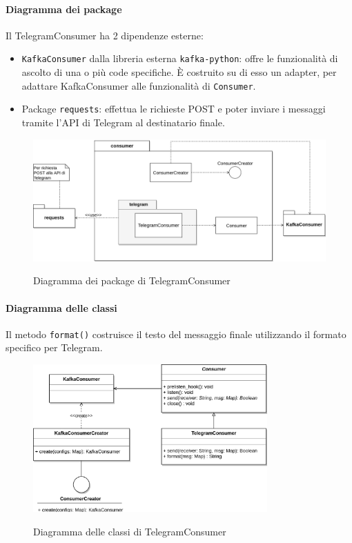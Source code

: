 \paragraph{Diagramma dei package}

Il TelegramConsumer ha 2 dipendenze esterne:
\begin{itemize}
    \item \texttt{KafkaConsumer} dalla libreria esterna \texttt{kafka-python}: offre le funzionalità di ascolto
        di una o più code specifiche. È costruito su di esso un adapter, per adattare KafkaConsumer alle funzionalità
        di \texttt{Consumer}.
    \item Package \texttt{requests}: effettua le richieste POST e poter inviare i messaggi tramite l'API di Telegram
        al destinatario finale.
\end{itemize}

\begin{figure}[H]
    \centering
    \includegraphics[width=\textwidth]{img/Package-TelegramConsumer.png}\\
    \caption{Diagramma dei package di TelegramConsumer}
\end{figure}

\paragraph{Diagramma delle classi}

Il metodo \texttt{format()} costruisce il testo del messaggio finale utilizzando il formato  specifico per Telegram.

\begin{figure}[H]
    \centering
    \includegraphics[width=0.8\textwidth]{img/Consumers-TelegramConsumer.png}\\
    \caption{Diagramma delle classi di TelegramConsumer}
\end{figure}



